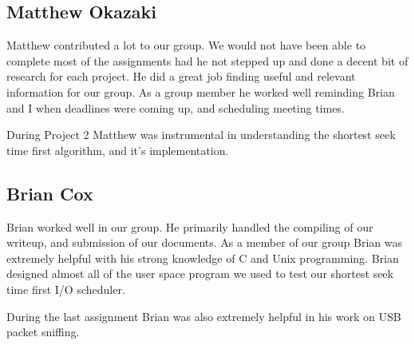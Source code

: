 \documentclass[letterpaper,10pt,titlepage]{article}
\begin{document}
\subsection*{Matthew Okazaki}

Matthew contributed a lot to our group. We would not have been able to
complete most of the assignments had he not stepped up and done a decent
bit of research for each project. He did a great job finding useful and
relevant information for our group. As a group member he worked well
reminding Brian and I when deadlines were coming up, and scheduling
meeting times.

During Project 2 Matthew was instrumental in understanding the shortest
seek time first algorithm, and it's implementation.

\subsection*{Brian Cox}

Brian worked well in our group. He primarily handled the compiling of
our writeup, and submission of our documents. As a member of our group
Brian was extremely helpful with his strong knowledge of C and Unix
programming. Brian designed almost all of the user space program we used
to test our shortest seek time first I/O scheduler.

During the last assignment Brian was also extremely helpful in his work
on USB packet sniffing.
\end{document}
